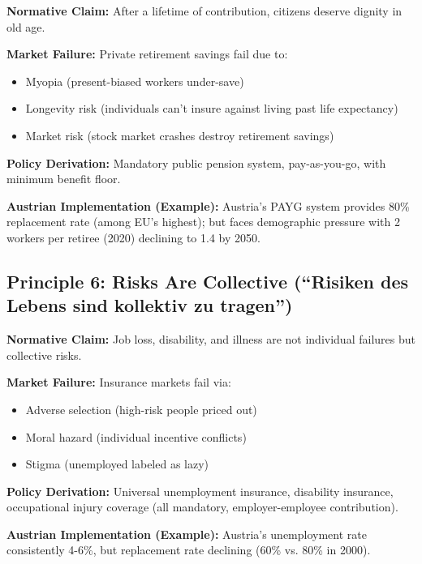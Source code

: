 \begin{tcolorbox}[colback=gray!5!white, colframe=gray!75!black,
    title=Principle GEN-5: Pension Guarantee]

\textbf{Normative Claim:} After a lifetime of contribution, citizens deserve dignity in old age.

\textbf{Market Failure:} Private retirement savings fail due to:
\begin{itemize}[nosep]
\item Myopia (present-biased workers under-save)
\item Longevity risk (individuals can't insure against living past life expectancy)
\item Market risk (stock market crashes destroy retirement savings)
\end{itemize}

\textbf{Policy Derivation:} Mandatory public pension system, pay-as-you-go, with minimum benefit floor.

\textbf{Austrian Implementation (Example):} Austria's PAYG system provides 80\% replacement rate (among EU's highest); but faces demographic pressure with 2 workers per retiree (2020) declining to 1.4 by 2050.

\end{tcolorbox}


\subsection{Principle 6: Risks Are Collective (``Risiken des Lebens sind kollektiv zu tragen'')}

\begin{tcolorbox}[colback=gray!5!white, colframe=gray!75!black,
    title=Principle GEN-6: Collective Insurance]

\textbf{Normative Claim:} Job loss, disability, and illness are not individual failures but collective risks.

\textbf{Market Failure:} Insurance markets fail via:
\begin{itemize}[nosep]
\item Adverse selection (high-risk people priced out)
\item Moral hazard (individual incentive conflicts)
\item Stigma (unemployed labeled as lazy)
\end{itemize}

\textbf{Policy Derivation:} Universal unemployment insurance, disability insurance, occupational injury coverage (all mandatory, employer-employee contribution).

\textbf{Austrian Implementation (Example):} Austria's unemployment rate consistently 4-6\%, but replacement rate declining (60\% vs. 80\% in 2000).

\end{tcolorbox}


